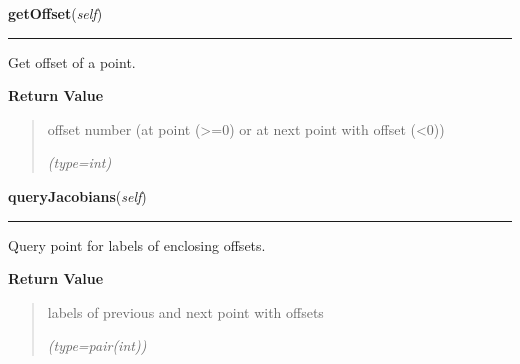 \hspace{.8\funcindent}\begin{boxedminipage}{\funcwidth}

    \raggedright \textbf{getOffset}(\textit{self})

    \vspace{-1.5ex}

    \rule{\textwidth}{0.5\fboxrule}
\setlength{\parskip}{2ex}
    Get offset of a point.

\setlength{\parskip}{1ex}
      \textbf{Return Value}
    \vspace{-1ex}

      \begin{quote}
      offset number (at point ({\textgreater}=0) or at next point with 
      offset ({\textless}0))

      {\it (type=int)}

      \end{quote}

    \end{boxedminipage}

    \label{gblfit:GblPoint:queryJacobians}

    \vspace{0.5ex}

\hspace{.8\funcindent}\begin{boxedminipage}{\funcwidth}

    \raggedright \textbf{queryJacobians}(\textit{self})

    \vspace{-1.5ex}

    \rule{\textwidth}{0.5\fboxrule}
\setlength{\parskip}{2ex}
    Query point for labels of enclosing offsets.

\setlength{\parskip}{1ex}
      \textbf{Return Value}
    \vspace{-1ex}

      \begin{quote}
      labels of previous and next point with offsets

      {\it (type=pair(int))}

      \end{quote}

    \end{boxedminipage}

    \label{gblfit:GblPoint:addJacobians}

